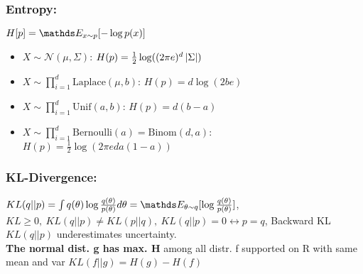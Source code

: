 \subsubsection{Entropy:}
$H[p] = \E[x \sim p]{-\log p(x)}$
\begin{itemize}
    \item $X \sim \mathcal{N}(\mu, \Sigma)$: $H(p)=\frac{1}{2} \log ((2\pi e)^{d} \left\lvert\Sigma\right\rvert)$
    \item $X \sim \prod_{i=1}^{d} \text{Laplace}(\mu, b)$: $H(p)=d \log (2be)$
    \item $X \sim \prod_{i=1}^{d} \text{Unif}(a, b)$: $H(p)=d(b-a)$
    \item $X \sim \prod_{i=1}^{d} \text{Bernoulli}(a) = \text{Binom}(d, a)$: $H(p)=\frac{1}{2} \log (2\pi ed a (1-a)) $
\end{itemize}

\subsubsection{KL-Divergence:}
$KL(q||p) = \int q(\theta) \log \frac{q(\theta)}{p(\theta)}d\theta = \E[\theta \sim q]{\log \frac{q(\theta)}{p(\theta)}}$,
$KL \geq 0,\ KL(q||p) \neq KL(p||q),\ KL(q||p) = 0 \leftrightarrow p=q$,
Backward KL $KL(q||p)$ underestimates uncertainty.\\

\textbf{The normal dist. g has max. H} among all distr. f supported on R with same mean and var
$KL(f||g) = H(g)-H(f)$\\

